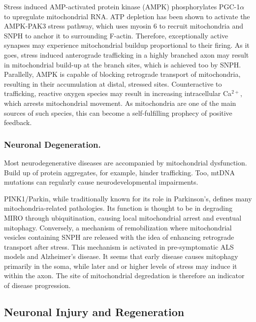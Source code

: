 \documentclass[12pt]{report}
\begin{document}
Stress induced AMP-activated protein kinase (AMPK) phosphorylates PGC-1$\alpha$ to upregulate mitochondrial RNA. ATP depletion has been shown to activate the AMPK-PAK3 stress pathway, which uses myosin 6 to recruit mitochondria and SNPH to anchor it to surrounding F-actin. Therefore, exceptionally active synapses may experience mitochondrial buildup proportional to their firing. As it goes, stress induced anterograde trafficking in a highly branched axon may result in mitochondrial build-up at the branch sites, which is achieved too by SNPH. Parallelly, AMPK is capable of blocking retrograde transport of mitochondria, resulting in their accumulation at distal, stressed sites. Counteractive to trafficking, reactive oxygen species may result in increasing intracellular Ca$^{2+}$, which arrests mitochondrial movement. As mitochondria are one of the main sources of such species, this can become a self-fulfilling prophecy of positive feedback.

\subsubsection{Neuronal Degeneration.}

Most neurodegenerative diseases are accompanied by mitochondrial dysfunction. Build up of protein aggregates, for example, hinder trafficking. Too, mtDNA mutations can regularly cause neurodevelopmental impairments.\newline

PINK1/Parkin, while traditionally known for its role in Parkinson's, defines many mitochondria-related pathologies. Its function is thought to be in degrading MIRO through ubiquitination, causing local mitochondrial arrest and eventual mitophagy. Conversely, a mechanism of remobilization where mitochondrial vesicles containing SNPH are released with the idea of enhancing retrograde transport after stress. This mechanism is activated in pre-symptomatic ALS models and Alzheimer's disease. It seems that early disease causes mitophagy primarily in the soma, while later and or higher levels of stress may induce it within the axon. The site of mitochondrial degredation is therefore an indicator of disease progression. 

\subsection{Neuronal Injury and Regeneration}
\end{document}
